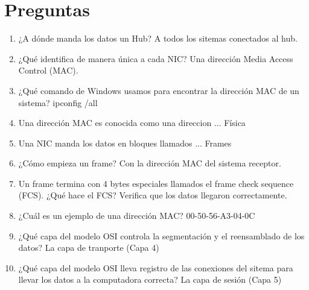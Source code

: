 \documentclass[12pt]{report}
\begin{document}
\section{Preguntas}

\begin{enumerate}
  \item ¿A dónde manda los datos un Hub?
    A todos los sitemas conectados al hub.
  \item ¿Qué identifica de manera única a cada NIC?
    Una dirección Media Access Control (MAC).
  \item ¿Qué comando de Windows usamos para encontrar la dirección MAC de un sistema?
    ipconfig /all
  \item Una dirección MAC es conocida como una direccion ...
    Física
  \item Una NIC manda los datos en bloques llamados ...
    Frames
  \item ¿Cómo empieza un frame?
   Con la dirección MAC del sistema receptor.
  \item Un frame termina con 4 bytes especiales llamados el frame check sequence (FCS). ¿Qué hace el FCS?
    Verifica que los datos llegaron correctamente.
  \item ¿Cuál es un ejemplo de una dirección MAC?
    00-50-56-A3-04-0C
  \item ¿Qué capa del modelo OSI controla la segmentación y el reensamblado de los datos?
    La capa de tranporte (Capa 4)
  \item ¿Qué capa del modelo OSI lleva registro de las conexiones del sitema para llevar los datos a la computadora correcta?
    La capa de sesión (Capa 5)
\end{enumerate}
\end{document}

